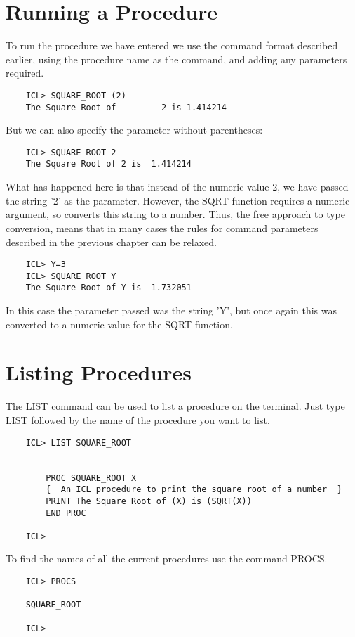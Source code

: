 \documentclass[twoside,11pt]{report}
\newcommand{\xlabel}[1]{}
\begin{document}
\section{\xlabel{running_a_procedure}Running a Procedure}
To run the procedure we have entered we use the command format described
earlier, using the procedure name as the command, and adding any parameters
required.
\begin{verbatim}
    ICL> SQUARE_ROOT (2)
    The Square Root of         2 is 1.414214
\end{verbatim}
But we can also specify the parameter without parentheses:
\begin{verbatim}
    ICL> SQUARE_ROOT 2
    The Square Root of 2 is  1.414214
\end{verbatim}
What has happened here is that instead of the numeric value 2, we have
passed the string '2' as the parameter. However, the SQRT function requires
a numeric argument, so converts this string to a number. Thus, the free
approach to type conversion, means that in many cases the rules for command
parameters described in the previous chapter can be relaxed.
\begin{verbatim}
    ICL> Y=3
    ICL> SQUARE_ROOT Y
    The Square Root of Y is  1.732051
\end{verbatim}
In this case the parameter passed was the string 'Y', but once again this
was converted to a numeric value for the SQRT function.
\section{\xlabel{listing_procedures}Listing Procedures}
The LIST command can be used to list a procedure on the terminal. Just type
LIST followed by the name of the procedure you want to list.
\begin{verbatim}
    ICL> LIST SQUARE_ROOT


        PROC SQUARE_ROOT X
        {  An ICL procedure to print the square root of a number  }
        PRINT The Square Root of (X) is (SQRT(X))
        END PROC

    ICL>
\end{verbatim}
To find the names of all the current procedures use the command PROCS.
\begin{verbatim}
    ICL> PROCS

    SQUARE_ROOT

    ICL>
\end{verbatim}
\end{document}
